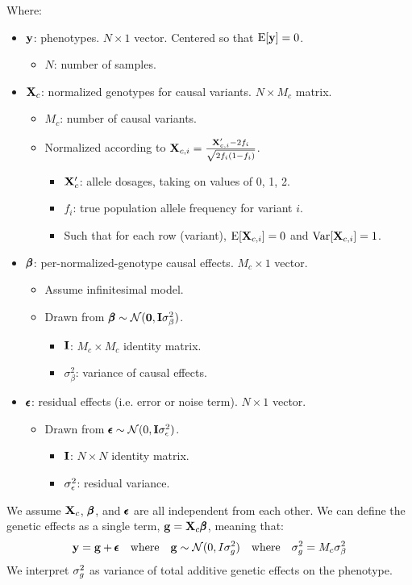 \documentclass[12pt]{article}
\begin{document}
Where:
\begin{itemize}
    \item $\mathbf{y}$: phenotypes.
    $N \times 1$ vector.
    Centered so that $\mathrm{E}[\mathbf{y}]=0$.
    \begin{itemize}
        \item $N$: number of samples.
    \end{itemize}
    \item $\mathbf{X}_c$: normalized genotypes for causal variants.
    $N \times M_c$ matrix.
    \begin{itemize}
        \item $M_c$: number of causal variants.
        \item Normalized according to
        $\mathbf{X}_{c,i} = \frac{\mathbf{X}'_{c,i} - 2 f_i}{\sqrt{2 f_i (1 - f_i)}}$.
        \begin{itemize}
            \item $\mathbf{X}_c'$: allele dosages, taking on values of 0, 1, 2.
            \item $f_i$: true population allele frequency for variant $i$.
            \item Such that for each row (variant), $\mathrm{E}[\mathbf{X}_{c,i}] = 0$ and $\mathrm{Var}[\mathbf{X}_{c,i}] = 1$.
        \end{itemize}
    \end{itemize}
    \item $\pmb{\beta}$: per-normalized-genotype causal effects.
    $M_c \times 1$ vector.
    \begin{itemize}
        \item Assume infinitesimal model.
        \item Drawn from $\pmb{\beta} \sim \mathcal{N}(\mathbf{0}, \mathbf{I} \sigma_{\beta}^2)$.
        \begin{itemize}
            \item $\mathbf{I}$: $M_c \times M_c$ identity matrix.
            \item $\sigma_{\beta}^2$: variance of causal effects.
        \end{itemize}
    \end{itemize}
    \item $\pmb{\epsilon}$: residual effects (i.e. error or noise term). $N \times 1$ vector.
    \begin{itemize}
        \item Drawn from $\pmb{\epsilon} \sim \mathcal{N}(0, \mathbf{I} \sigma_{\epsilon}^2)$.
        \begin{itemize}
            \item $\mathbf{I}$: $N \times N$ identity matrix.
            \item $\sigma_{\epsilon}^2$: residual variance.
        \end{itemize}
    \end{itemize}
\end{itemize}
We assume $\mathbf{X}_c$, $\pmb{\beta}$, and $\pmb{\epsilon}$ are all independent from each other.
We can define the genetic effects as a single term, $\mathbf{g} = \mathbf{X}_c \pmb{\beta}$, meaning that:
\begin{equation*}
\mathbf{y} = \mathbf{g} + \pmb{\epsilon}
\quad\mathrm{where}\quad
\mathbf{g} \sim \mathcal{N}(0, I \sigma_g^2)
\quad\mathrm{where}\quad
\sigma_g^2 = M_c \sigma_{\beta}^2
\end{equation*}
We interpret $\sigma_g^2$ as variance of total additive genetic effects on the phenotype.
\end{document}
